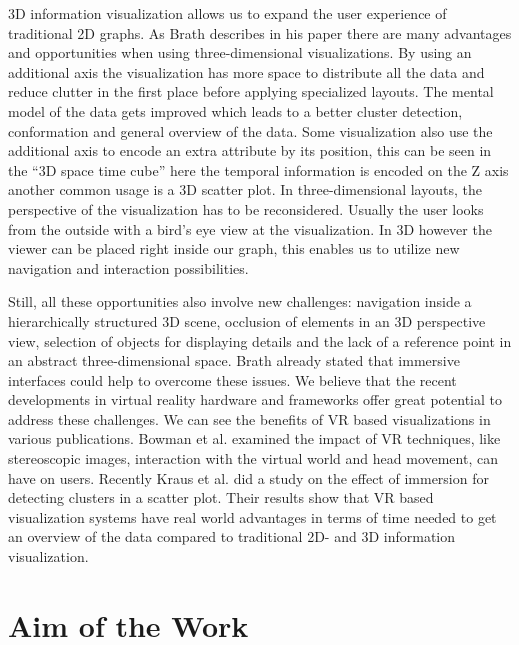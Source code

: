 3D information visualization allows us to expand the user experience of traditional 2D graphs. As Brath describes in his paper \cite{brath_3d_2014} there are many advantages and opportunities when using three-dimensional visualizations.
By using an additional axis the visualization has more space to distribute all the data and reduce clutter in the first place before applying specialized layouts. The mental model of the data gets improved which leads to a better cluster detection, conformation and general overview of the data. 
Some visualization also use the additional axis to encode an extra attribute by its position, this can be seen in the “3D space time cube” \cite{brath_3d_2014} here the temporal information is encoded on the Z axis another common usage is a 3D scatter plot.
In three-dimensional layouts, the perspective of the visualization has to be reconsidered. Usually the user looks from the outside with a bird's eye view at the visualization. In 3D however the viewer can be placed right inside our graph, this enables us to utilize new navigation and interaction possibilities.

Still, all these opportunities also involve new challenges: navigation inside a hierarchically structured 3D scene, occlusion of elements in an 3D perspective view, selection of objects for displaying details and the lack of a reference point in an abstract three-dimensional space. Brath \cite{brath_3d_2014} already stated that immersive interfaces could help to overcome these issues.
We believe that the recent developments in virtual reality hardware and frameworks offer great potential to address these challenges. 
We can see the benefits of VR based visualizations in various publications. Bowman et al. \cite{bowman_virtual_2007} examined the impact of VR techniques, like stereoscopic images, interaction with the virtual world and head movement, can have on users. 
Recently Kraus et al. \cite{kraus_impact_2020} did a study on the effect of immersion for detecting clusters in a scatter plot. Their results show that VR based visualization systems have real world advantages in terms of time needed to get an overview of the data compared to traditional 2D- and 3D information visualization. 
 
\section{Aim of the Work}

